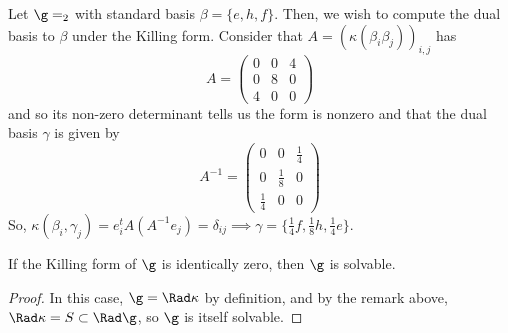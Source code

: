 \documentclass[11pt,leqno,oneside]{amsart}
\numberwithin{thm}{section}
\begin{document}
\begin{example}
  Let \(\g = \sl_2\) with standard basis \(\beta = \{e,h,f\}\). Then, we wish
  to compute the dual basis to \(\beta\) under the Killing
  form. Consider that \(A = (\kappa(\beta_i
  \beta_j))_{i,j}\) has \[
    A = \left(
      \begin{array}{ccc}
        0 & 0 & 4 \\
        0 & 8 & 0 \\
        4 & 0 & 0
      \end{array}
    \right)
  \]
  and so its non-zero determinant tells us the form is nonzero and
  that the dual basis \(\gamma\) is given by \[
    A^{-1} = \left(
      \begin{array}{ccc}
        0 & 0 & \frac{1}{4} \\
        0 & \frac{1}{8} & 0 \\
        \frac{1}{4} & 0 & 0
      \end{array}
    \right)
  \]
  So, \(\kappa(\beta_i, \gamma_j) = e_i^t A (A^{-1} e_j) = \delta_{ij} \implies
  \gamma = \{\frac{1}{4}f, \frac{1}{8}h, \frac{1}{4}e\}\).
\end{example}
\begin{thm}
  If the Killing form of \(\g\) is identically zero, then \(\g\) is
  solvable.
\end{thm}
\begin{proof}
  In this case, \(\g = \Rad \kappa\) by definition, and by the remark
  above, \(\Rad \kappa = S \subset \Rad \g\), so \(\g\) is
  itself solvable. 
\end{proof}
\end{document}
